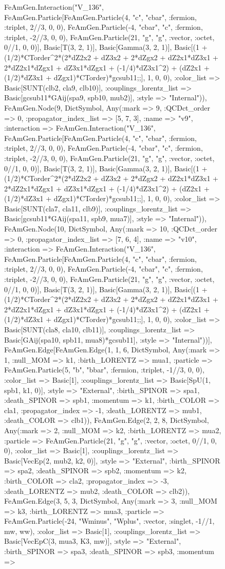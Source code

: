 \documentclass{revtex4}
\begin{document}
\begin{figure}[!htb]
\begin{center}
{FeAmGen.Interaction("V_136", FeAmGen.Particle[FeAmGen.Particle(4, "c", "cbar", :fermion, :triplet, 2//3, 0, 0), FeAmGen.Particle(-4, "cbar", "c", :fermion, :triplet, -2//3, 0, 0), FeAmGen.Particle(21, "g", "g", :vector, :octet, 0//1, 0, 0)], Basic[T(3, 2, 1)], Basic[Gamma(3, 2, 1)], Basic[(1 + (1/2)*CTorder^2*(2*dZ2x2 + dZ3x2 + 2*dZgx2 + dZ2x1*dZ3x1 + 2*dZ2x1*dZgx1 + dZ3x1*dZgx1 + (-1/4)*dZ3x1^2) + (dZ2x1 + (1/2)*dZ3x1 + dZgx1)*CTorder)*gcsub11;;], 1, 0, 0), :color_list => Basic[SUNT(clb2, cla9, clb10)], :couplings_lorentz_list => Basic[gcsub11*GAij(spa9, spb10, mub2)], :style => "Internal")), FeAmGen.Node(9, Dict{Symbol, Any}(:mark => 9, :QCDct_order => 0, :propagator_index_list => [5, 7, 3], :name => "v9", :interaction => FeAmGen.Interaction("V_136", FeAmGen.Particle[FeAmGen.Particle(4, "c", "cbar", :fermion, :triplet, 2//3, 0, 0), FeAmGen.Particle(-4, "cbar", "c", :fermion, :triplet, -2//3, 0, 0), FeAmGen.Particle(21, "g", "g", :vector, :octet, 0//1, 0, 0)], Basic[T(3, 2, 1)], Basic[Gamma(3, 2, 1)], Basic[(1 + (1/2)*CTorder^2*(2*dZ2x2 + dZ3x2 + 2*dZgx2 + dZ2x1*dZ3x1 + 2*dZ2x1*dZgx1 + dZ3x1*dZgx1 + (-1/4)*dZ3x1^2) + (dZ2x1 + (1/2)*dZ3x1 + dZgx1)*CTorder)*gcsub11;;], 1, 0, 0), :color_list => Basic[SUNT(cla7, cla11, clb9)], :couplings_lorentz_list => Basic[gcsub11*GAij(spa11, spb9, mua7)], :style => "Internal")), FeAmGen.Node(10, Dict{Symbol, Any}(:mark => 10, :QCDct_order => 0, :propagator_index_list => [7, 6, 4], :name => "v10", :interaction => FeAmGen.Interaction("V_136", FeAmGen.Particle[FeAmGen.Particle(4, "c", "cbar", :fermion, :triplet, 2//3, 0, 0), FeAmGen.Particle(-4, "cbar", "c", :fermion, :triplet, -2//3, 0, 0), FeAmGen.Particle(21, "g", "g", :vector, :octet, 0//1, 0, 0)], Basic[T(3, 2, 1)], Basic[Gamma(3, 2, 1)], Basic[(1 + (1/2)*CTorder^2*(2*dZ2x2 + dZ3x2 + 2*dZgx2 + dZ2x1*dZ3x1 + 2*dZ2x1*dZgx1 + dZ3x1*dZgx1 + (-1/4)*dZ3x1^2) + (dZ2x1 + (1/2)*dZ3x1 + dZgx1)*CTorder)*gcsub11;;], 1, 0, 0), :color_list => Basic[SUNT(cla8, cla10, clb11)], :couplings_lorentz_list => Basic[GAij(spa10, spb11, mua8)*gcsub11], :style => "Internal"))], FeAmGen.Edge[FeAmGen.Edge(1, 1, 6, Dict{Symbol, Any}(:mark => 1, :null_MOM => k1, :birth_LORENTZ => mua1, :particle => FeAmGen.Particle(5, "b", "bbar", :fermion, :triplet, -1//3, 0, 0), :color_list => Basic[1], :couplings_lorentz_list => Basic[SpU(1, spb1, k1, 0)], :style => "External", :birth_SPINOR => spa1, :death_SPINOR => spb1, :momentum => k1, :birth_COLOR => cla1, :propagator_index => -1, :death_LORENTZ => mub1, :death_COLOR => clb1)), FeAmGen.Edge(2, 2, 8, Dict{Symbol, Any}(:mark => 2, :null_MOM => k2, :birth_LORENTZ => mua2, :particle => FeAmGen.Particle(21, "g", "g", :vector, :octet, 0//1, 0, 0), :color_list => Basic[1], :couplings_lorentz_list => Basic[VecEp(2, mub2, k2, 0)], :style => "External", :birth_SPINOR => spa2, :death_SPINOR => spb2, :momentum => k2, :birth_COLOR => cla2, :propagator_index => -3, :death_LORENTZ => mub2, :death_COLOR => clb2)), FeAmGen.Edge(3, 5, 3, Dict{Symbol, Any}(:mark => 3, :null_MOM => k3, :birth_LORENTZ => mua3, :particle => FeAmGen.Particle(-24, "Wminus", "Wplus", :vector, :singlet, -1//1, mw, ww), :color_list => Basic[1], :couplings_lorentz_list => Basic[VecEpC(3, mua3, K3, mw)], :style => "External", :birth_SPINOR => spa3, :death_SPINOR => spb3, :momentum => }
\end{center}
\end{figure}
\end{document}
